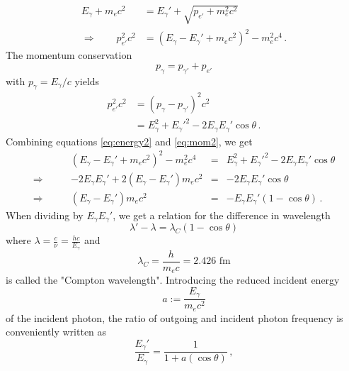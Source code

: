 \begin{align}
    E_\gamma + m_ec^2 &= E_\gamma' + \sqrt{p_{e'} + m_e^2c^2} \\
    \Rightarrow \qquad p_{e'}^2c^2 &= \left(E_\gamma - E_\gamma' + m_ec^2\right)^2 - m_e^2c^4 \, .
    \label{eq:energy2}
\end{align}
The momentum conservation 
\begin{equation}
    p_\gamma = p_{\gamma'} + p_{e'}	
    \label{eq:momentum_conservation}
\end{equation}
with $p_\gamma = E_\gamma/c$ yields
\begin{equation}
    \begin{split}
        p_{e'}^2c^2  &= \left(p_\gamma - p_{\gamma'}\right)^2c^2 \\
                     &= E_\gamma^2 +  E_\gamma'^2 - 2E_\gamma E_\gamma'\cos\theta \, .
        \label{eq:mom2}
    \end{split}
\end{equation}
Combining equations \eqref{eq:energy2} and \eqref{eq:mom2}, we get
\begin{align}
    &(E_\gamma - E_\gamma' + m_ec^2)^2 - m_e^2c^4 	&=& E_\gamma^2 +  E_\gamma'^2 - 2E_\gamma E_\gamma'\cos\theta \\
    \Rightarrow \qquad &-2E_\gamma E_\gamma' + 2(E_\gamma - E_\gamma')m_ec^2 &=& -2E_\gamma E_\gamma'\cos\theta \\
    \Rightarrow \qquad &(E_\gamma - E_\gamma')m_ec^2 &=& -E_\gamma E_\gamma'(1 - \cos\theta) \, .
    \label{eq:en_mom}
\end{align}
When dividing by $E_\gamma E_\gamma'$, we get a relation for the difference in wavelength 
\begin{equation}
    \lambda' - \lambda = \lambda_C(1 - \cos\theta)	
    \label{eq:compton1}
\end{equation}
where $\lambda = \frac{c}{\nu} = \frac{h c}{E_\gamma}$ and 
\begin{equation}
    \lambda_C = \frac{h}{m_ec} = 2.426 \text{ fm} 
    \label{eq:compton_wavelength}
\end{equation}
is called the "Compton wavelength". 
Introducing the reduced incident energy 
\begin{equation}
    a := \frac{E_\gamma}{m_ec^2}    \label{eq:ered}
\end{equation}
of the incident photon, the ratio of outgoing and incident photon frequency is conveniently written as 
\begin{equation}
    \frac{E_\gamma'}{E_\gamma} = \frac{1}{1 + a(\cos\theta)}	\, ,
    \label{eq:freq_rati}
\end{equation}
